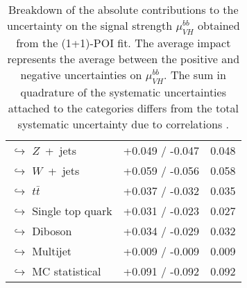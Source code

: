 \begin{table}[tbp]
\begin{center}
\begin{tabular}{ l | l  c c }
        \multicolumn{2}{l}{$\hookrightarrow$ $Z$~+~jets} & +0.049 / -0.047  & 0.048 \\
        \multicolumn{2}{l}{$\hookrightarrow$ $W$~+~jets} & +0.059 / -0.056  & 0.058 \\
        \multicolumn{2}{l}{$\hookrightarrow$ $t\bar{t}$} & +0.037 / -0.032  & 0.035 \\
        \multicolumn{2}{l}{$\hookrightarrow$ Single top quark} & +0.031 / -0.023  & 0.027 \\
        \multicolumn{2}{l}{$\hookrightarrow$ Diboson} & +0.034 / -0.029  & 0.032 \\
        \multicolumn{2}{l}{$\hookrightarrow$ Multijet} & +0.009 / -0.009  & 0.009 \\
        \multicolumn{2}{l}{$\hookrightarrow$ MC statistical} & +0.091 / -0.092  & 0.092 \\        
        \hline\bottomrule
    \end{tabular}
    \end{center}
    \caption{
        Breakdown of the absolute contributions to the uncertainty on the signal strength $\mu_{VH}^{bb}$ obtained from the (1+1)-POI fit. 
        The average impact represents the average between the positive and negative uncertainties on $\mu_{VH}^{bb}$.
        The sum in quadrature of the systematic uncertainties attached to the categories differs from the total systematic uncertainty due to correlations \cite{Dao:2688371}. 
    }
    \label{tab:mu_syst_unc}
\end{table}
    